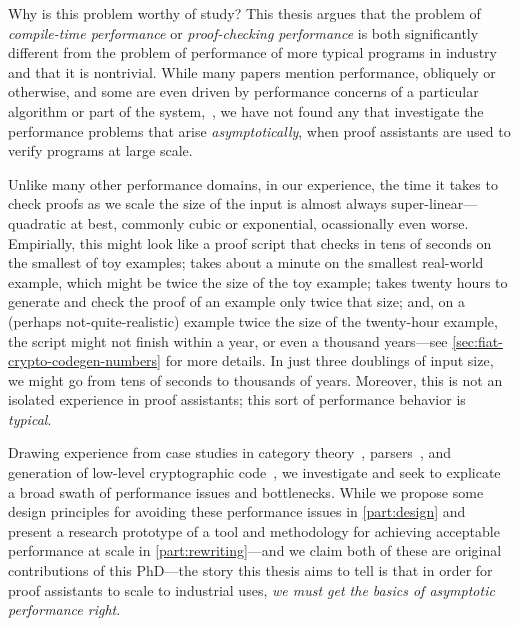 Why is this problem worthy of study?
This thesis argues that the problem of \emph{compile-time performance} or \emph{proof-checking performance} is both significantly different from the problem of performance of more typical programs in industry and that it is nontrivial.
While many papers mention performance, obliquely or otherwise, and some are even driven by performance concerns of a particular algorithm or part of the system,~\cites[p.~1382]{gonthier2008formal}{Efficiency1994Boulton}{Proving2005Benjamin}{Idris2Faster2020Brady}{Recognizing1989Benanav}{mechanical1990Pierce}, we have not found any that investigate the performance problems that arise \emph{asymptotically}, when proof assistants are used to verify programs at large scale.

Unlike many other performance domains, in our experience, the time it takes to check proofs as we scale the size of the input is almost always super-linear---quadratic at best, commonly cubic or exponential, ocassionally even worse.
Empirially, this might look like a proof script that checks in tens of seconds on the smallest of toy examples; takes about a minute on the smallest real-world example, which might be twice the size of the toy example; takes twenty hours to generate and check the proof of an example only twice that size; and, on a (perhaps not-quite-realistic) example twice the size of the twenty-hour example, the script might not finish within a year, or even a thousand years---see \autoref{sec:fiat-crypto-codegen-numbers} for more details.
In just three doublings of input size, we might go from tens of seconds to thousands of years.
Moreover, this is not an isolated experience in proof assistants; this sort of performance behavior is \emph{typical}.

Drawing experience from case studies in category theory~\cite{category-coq-experience}, parsers~\cite{jgross-masters-thesis}, and generation of low-level cryptographic code~\cite{FiatCryptoSP19}, we investigate and seek to explicate a broad swath of performance issues and bottlenecks.
While we propose some design principles for avoiding these performance issues in \autoref{part:design} and present a research prototype of a tool and methodology for achieving acceptable performance at scale in \autoref{part:rewriting}---and we claim both of these are original contributions of this PhD---the story this thesis aims to tell is that in order for proof assistants to scale to industrial uses, \emph{we must get the basics of asymptotic performance right}.



